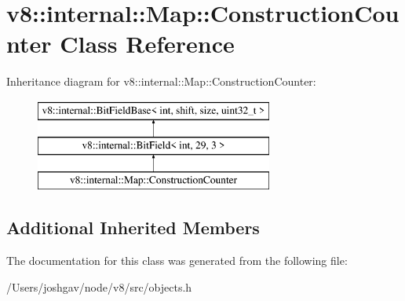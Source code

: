 \hypertarget{classv8_1_1internal_1_1_map_1_1_construction_counter}{}\section{v8\+:\+:internal\+:\+:Map\+:\+:Construction\+Counter Class Reference}
\label{classv8_1_1internal_1_1_map_1_1_construction_counter}
Inheritance diagram for v8\+:\+:internal\+:\+:Map\+:\+:Construction\+Counter\+:\begin{figure}[H]
\begin{center}
\leavevmode
\includegraphics[height=3.000000cm]{classv8_1_1internal_1_1_map_1_1_construction_counter}
\end{center}
\end{figure}
\subsection*{Additional Inherited Members}


The documentation for this class was generated from the following file\+:\begin{DoxyCompactItemize}
\item 
/\+Users/joshgav/node/v8/src/objects.\+h\end{DoxyCompactItemize}
